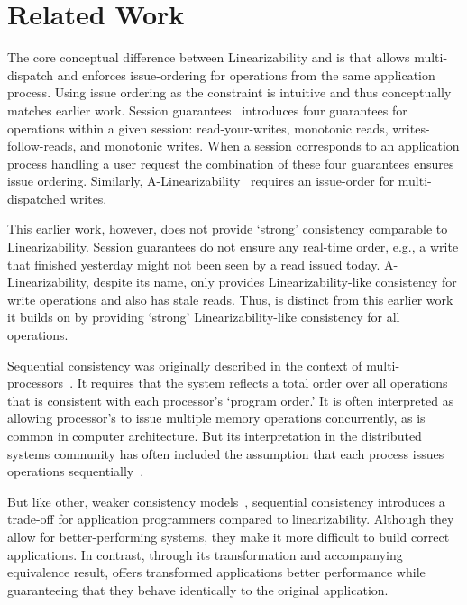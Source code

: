 \section{Related Work}
\label{sec:related}

The core conceptual difference between Linearizability and \mdl{} is that \mdl{} allows multi-dispatch and enforces issue-ordering for operations from the same application process.
Using issue ordering as the constraint is intuitive and thus conceptually matches earlier work.
Session guarantees~\cite{terry1994session} introduces four guarantees for operations within a given session: read-your-writes, monotonic reads, writes-follow-reads, and monotonic writes. When a session corresponds to an application process handling a user request the combination of these four guarantees ensures issue ordering.
Similarly, A-Linearizability~\cite{hunt2010zookeeper} requires an issue-order for multi-dispatched writes.

This earlier work, however, does not provide `strong' consistency comparable to Linearizability.
Session guarantees do not ensure any real-time order, e.g., a write that finished yesterday might not been seen by a read issued today.
A-Linearizability, despite its name, only provides Linearizability-like consistency for write operations and also has stale reads.
Thus, \Mdl{} is distinct from this earlier work it builds on by providing `strong' Linearizability-like consistency for all operations.

Sequential consistency was originally described in the context of
multi-processors~\cite{lamport1979sequential}. It requires that
the system reflects a total order over all operations that is 
consistent with each processor's `program order.' It is often
interpreted as allowing processor's to issue multiple memory 
operations concurrently, as is common in computer architecture.
But its interpretation in the distributed systems community has often
included the assumption that each process issues operations 
sequentially~\cite{attiya1993seqlin}.

But like other, weaker consistency
models~\cite{ahamad1995causal,lloyd2011cops,terry1995bayou,deCandia2007dynamo}, 
sequential consistency introduces a trade-off for application
programmers compared to linearizability. Although they allow for
better-performing systems, they make it more difficult to build
correct applications. In contrast, through its transformation
and accompanying equivalence result, \MDL{} offers transformed
applications better performance while guaranteeing that they behave 
identically to the original application.

